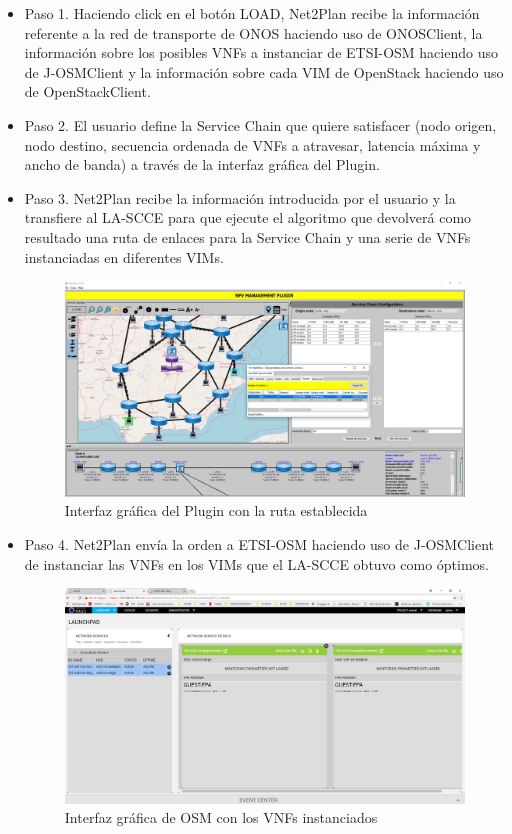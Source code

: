 \begin{itemize}
	\item Paso 1. Haciendo click en el botón LOAD, Net2Plan recibe la información referente a la red de transporte de ONOS haciendo uso de ONOSClient, la información sobre los posibles VNFs a instanciar de ETSI-OSM haciendo uso de J-OSMClient y la información sobre cada VIM de OpenStack haciendo uso de OpenStackClient.
	
	\item Paso 2. El usuario define la Service Chain que quiere satisfacer (nodo origen, nodo destino, secuencia ordenada de VNFs a atravesar, latencia máxima y ancho de banda) a través de la interfaz gráfica del Plugin.
	
	\item Paso 3. Net2Plan recibe la información introducida por el usuario y la transfiere al LA-SCCE para que ejecute el algoritmo que devolverá como resultado una ruta de enlaces para la Service Chain y una serie de VNFs instanciadas en diferentes VIMs.
	
		\begin{figure}[!ht]
		\centering
		\includegraphics[width=0.9\linewidth]{imagenes/nfv_service_chain}
		\caption{Interfaz gráfica del Plugin con la ruta establecida}
		\label{fig:nfvservicechain}
	\end{figure}
	
	\item Paso 4. Net2Plan envía la orden a ETSI-OSM haciendo uso de J-OSMClient de instanciar las VNFs en los VIMs que el LA-SCCE obtuvo como óptimos.
	
	\begin{figure}[!ht]
		\centering
		\includegraphics[width=0.9\linewidth]{imagenes/osm_vnfs}
		\caption{Interfaz gráfica de OSM con los VNFs instanciados}
		\label{fig:osmvnfs}
	\end{figure}
	

\end{itemize}
